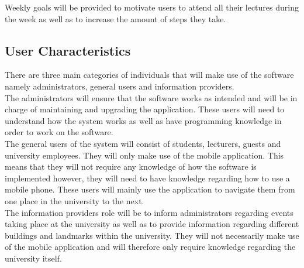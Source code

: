 \documentclass[11pt,a4paper]{article}
\begin{document}
	Weekly goals will be provided to motivate users to attend all their lectures during the week as well as to increase the amount of steps they take.

	\subsection{User Characteristics}
	There are three main categories of individuals that will make use of the software namely administrators, general users and information providers.
	\\


	The administrators will ensure that the software works as intended and will be in charge of maintaining and upgrading the application. These users will need to understand how the system works as well as have programming knowledge in order to work on the software.
	\\

	The general users of the system will consist of students, lecturers, guests and university employees. They will only make use of the mobile application. This means that they will not require any knowledge of how the software is implemented however, they will need to have knowledge regarding how to use a mobile phone. These users will mainly use the application to navigate them 		from one place in the university to the next.
	\\

	The information providers role will be to inform administrators regarding events taking place at the university as well as to provide information regarding different buildings and landmarks within the university. They will not necessarily make use of the mobile application and will therefore only require knowledge regarding the university itself.
\end{document}
